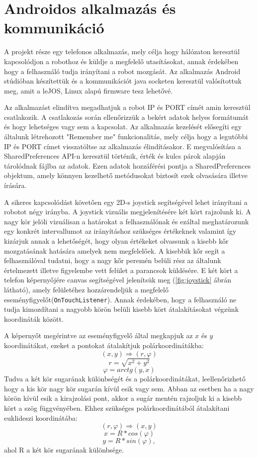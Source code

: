 \section{Androidos alkalmazás és kommunikáció}\label{sec:MEGVALOSITAS:android}
A projekt része egy telefonos alkalmazás, mely célja hogy hálózaton keresztül kapcsolódjon a robothoz és küldje a megfelelő utasításokat, annak érdekében hogy a felhasználó tudja irányítani a robot mozgását. Az alkalmazás Android stúdióban készítettük és a kommunikációt java socketen keresztül valósítottuk meg, amit a leJOS, Linux alapú firmware tesz lehetővé.

Az alkalmazást elindítva megadhatjuk a robot IP és PORT címét amin keresztül csatlakozik. A csatlakozás során ellenőrizzük a bekért adatok helyes formátumát és hogy lehetséges vagy sem a kapcsolat. Az alkalmazás kezelését elősegíti egy általunk létrehozott "Remember me" funkcionalitás, mely célja hogy a legutóbbi IP és PORT címet visszatöltse az alkalmazás élindításakor. E megvalósítása a SharedPreferences API-n keresztül történik, érték és kulcs párok alapján tárolódnak fájlba az adatok. Ezen adatok hozzáférési pontja a SharedPreferences objektum, amely könnyen kezelhető metódusokat biztosít ezek olvasására illetve írására.

A sikeres kapcsolódást követően egy 2D-s joystick segítségével lehet irányítani a robotot négy irányba. A joystick vizuális megjelenítésére két kört rajzolunk ki. A nagy kör jelöli vizuálisan a határokat a felhasználónak és ezáltal meghatározunk egy konkrét intervallumot az irányításhoz szükséges értékeknek valamint így kizárjuk annak a lehetőségét, hogy olyan értékeket olvassunk a kisebb kőr mozgatásának hatására amelyek nem megfelelőek. A kisebbik kőr segít a felhasználóval tudatni, hogy a nagy kőr peremén belüli rész az általunk értelmezett illetve figyelembe vett felület a parancsok küldésére. E két kört a telefon képernyőjére canvas segítségével jelenítsük meg (\ref{fig:joystick} ábrán látható), amely felületéhez hozzárendeljük a megfelelő eseményfigyelőt(\texttt{OnTouchListener}). Annak érdekében, hogy a felhasználó ne tudja kimozdítani a nagyobb körön belüli kisebb kört átalakításokat végzünk koordináták között.

A képernyőt megérintve az eseményfigyelő által megkapjuk az $x$ és $y$ koordinátákat, ezeket a pontokat átalakítjuk polárkoordinátákba: $$(x,y) \Longrightarrow (r,\varphi)$$ $$r=\sqrt{x^2+y^2}$$ $$\varphi=arctg(y,x)$$ Tudva a két kör sugarának különbségét és a polárkoordinátákat, leellenőrizhető hogy a kis kör nagy kör sugarán kívül esik vagy sem. Abban az esetben ha a nagy körön kívül esik a kirajzolási pont, akkor a sugár mentén rajzoljuk ki a kisebb kört a szög függvényében. Ehhez szükséges polárkoordinátából átalakítani euklideszi koordinátába:  $$(r,\varphi) \Longrightarrow (x,y)$$ $$x=R*cos(\varphi)$$ $$y=R*sin(\varphi),$$ ahol R a két kör sugarának különbsége.

